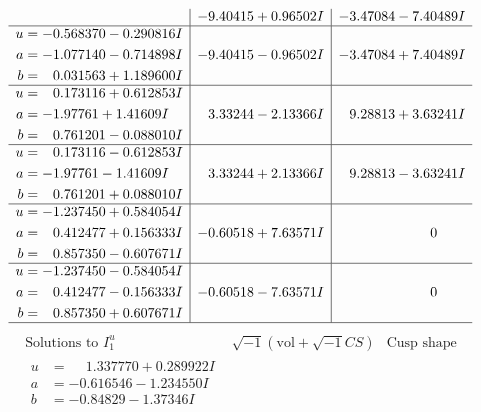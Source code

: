 \documentclass[1p]{elsarticle_modified}
\theoremstyle{definition}
\newcommand{\I}{\sqrt{-1}}
\begin{document}
$$\begin{array}{c|c|c}
 & -9.40415 + 0.96502 I & -3.47084 - 7.40489 I \\ \hline\begin{aligned}
u &= -0.568370 - 0.290816 I \\
a &= -1.077140 - 0.714898 I \\
b &= \phantom{-}0.031563 + 1.189600 I\end{aligned}
 & -9.40415 - 0.96502 I & -3.47084 + 7.40489 I \\ \hline\begin{aligned}
u &= \phantom{-}0.173116 + 0.612853 I \\
a &= -1.97761 + 1.41609 I \\
b &= \phantom{-}0.761201 - 0.088010 I\end{aligned}
 & \phantom{-}3.33244 - 2.13366 I & \phantom{-}9.28813 + 3.63241 I \\ \hline\begin{aligned}
u &= \phantom{-}0.173116 - 0.612853 I \\
a &= -1.97761 - 1.41609 I \\
b &= \phantom{-}0.761201 + 0.088010 I\end{aligned}
 & \phantom{-}3.33244 + 2.13366 I & \phantom{-}9.28813 - 3.63241 I \\ \hline\begin{aligned}
u &= -1.237450 + 0.584054 I \\
a &= \phantom{-}0.412477 + 0.156333 I \\
b &= \phantom{-}0.857350 - 0.607671 I\end{aligned}
 & -0.60518 + 7.63571 I & \phantom{-0.000000 } 0 \\ \hline\begin{aligned}
u &= -1.237450 - 0.584054 I \\
a &= \phantom{-}0.412477 - 0.156333 I \\
b &= \phantom{-}0.857350 + 0.607671 I\end{aligned}
 & -0.60518 - 7.63571 I & \phantom{-0.000000 } 0\\
 \hline 
 \end{array}$$\newpage$$\begin{array}{c|c|c}  
\text{Solutions to }I^u_{1}& \I (\text{vol} + \sqrt{-1}CS) & \text{Cusp shape}\\
 \hline 
\begin{aligned}
u &= \phantom{-}1.337770 + 0.289922 I \\
a &= -0.616546 - 1.234550 I \\
b &= -0.84829 - 1.37346 I\end{aligned}

\end{array}$$
\end{document}
